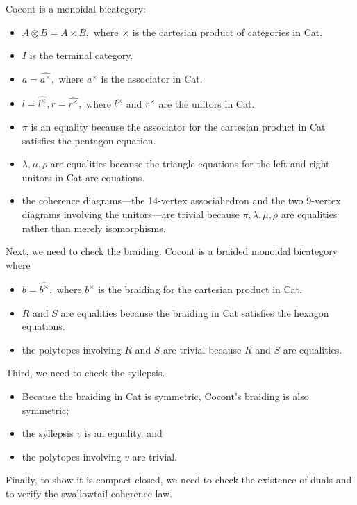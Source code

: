\documentclass[12pt,twoside,openright]{report}
\newcommand{\tensor}{\otimes}
\begin{document}
Cocont is a monoidal bicategory:
\begin{itemize}
  \item $A \tensor B = A \times B,$ where $\times$ is the cartesian product of categories in Cat.
  \item $I$ is the terminal category.
  \item $a = \widehat{a^\times},$ where $a^\times$ is the associator in Cat.
  \item $l = \widehat{l^\times}, r = \widehat{r^\times},$ where
$l^\times$ and $r^\times$ are the unitors in Cat.
  \item $\pi$ is an equality because the associator for the cartesian product in Cat satisfies the pentagon equation.
  \item $\lambda, \mu, \rho$ are equalities because the triangle equations for the left and right unitors in Cat are equations.
  \item the coherence diagrams---the 14-vertex associahedron and the two
9-vertex diagrams involving the unitors---are trivial because $\pi,
\lambda, \mu, \rho$ are equalities rather than merely isomorphisms.
\end{itemize}
Next, we need to check the braiding.  Cocont is a braided monoidal bicategory where
\begin{itemize}
  \item $b = \widehat{b^\times},$ where $b^\times$ is the braiding for the cartesian product in Cat.
  \item $R$ and $S$ are equalities because the braiding in Cat satisfies the hexagon equations.
  \item the polytopes involving $R$ and $S$ are trivial because $R$ and
$S$ are equalities.
\end{itemize}
Third, we need to check the syllepsis.  
\begin{itemize}
  \item Because the braiding in Cat is symmetric, Cocont's braiding is also symmetric;
  \item the syllepsis $v$ is an equality, and
  \item the polytopes involving $v$ are trivial.
\end{itemize}
Finally, to show it is compact closed, we need to check the existence of duals and to verify the swallowtail coherence law.
\end{document}
